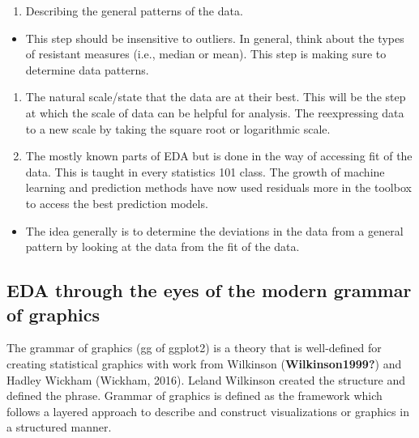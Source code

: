 \documentclass[print]{nuthesis}
\providecommand{\tightlist}{%
  \setlength{\itemsep}{0pt}\setlength{\parskip}{0pt}}
\begin{document}
\begin{enumerate}
\def\labelenumi{\arabic{enumi}.}
\setcounter{enumi}{1}
\tightlist
\item
  Describing the general patterns of the data.
\end{enumerate}

\begin{itemize}
\tightlist
\item
  This step should be insensitive to outliers. In general, think about the types of resistant measures (i.e., median or mean). This step is making sure to determine data patterns.
\end{itemize}

\begin{enumerate}
\def\labelenumi{\arabic{enumi}.}
\setcounter{enumi}{2}
\item
  The natural scale/state that the data are at their best. This will be the step at which the scale of data can be helpful for analysis. The reexpressing data to a new scale by taking the square root or logarithmic scale.
\item
  The mostly known parts of EDA but is done in the way of accessing fit of the data. This is taught in every statistics 101 class. The growth of machine learning and prediction methods have now used residuals more in the toolbox to access the best prediction models.
\end{enumerate}

\begin{itemize}
\tightlist
\item
  The idea generally is to determine the deviations in the data from a general pattern by looking at the data from the fit of the data.
\end{itemize}

\hypertarget{eda-through-the-eyes-of-the-modern-grammar-of-graphics}{%
\subsection{EDA through the eyes of the modern grammar of graphics}\label{eda-through-the-eyes-of-the-modern-grammar-of-graphics}}

The grammar of graphics (gg of ggplot2) is a theory that is well-defined for creating statistical graphics with work from Wilkinson (\textbf{Wilkinson1999?}) and Hadley Wickham (Wickham, 2016). Leland Wilkinson created the structure and defined the phrase. Grammar of graphics is defined as the framework which follows a layered approach to describe and construct visualizations or graphics in a structured manner.
\end{document}
